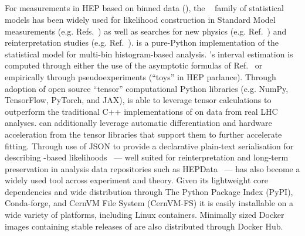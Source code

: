 \subsection{\pyhf{}}\label{subsec:pyhf}

For measurements in HEP based on binned data (), the \HiFa{}~\cite{Cranmer:1456844} family of statistical models has been widely used for likelihood construction in Standard Model measurements (e.g. Refs.~\cite{HIGG-2013-02,Aaij:2015sqa}) as well as searches for new physics (e.g. Ref.~\cite{SUSY-2016-10}) and reinterpretation studies (e.g. Ref.~\cite{Alguero:2020grj}).
\pyhf{} is a pure-Python implementation of the \HiFa{} statistical model for multi-bin histogram-based analysis.
\pyhf{}'s interval estimation is computed through either the use of the asymptotic formulas of Ref.~\cite{Cowan:2010js} or empirically through pseudoexperiments (``toys'' in HEP parlance).
Through adoption of open source ``tensor'' computational Python libraries (e.g. NumPy, TensorFlow, PyTorch, and JAX), \pyhf{} is able to leverage tensor calculations to outperform the traditional C++ implementations of \HiFa{} on data from real LHC analyses.
\pyhf{} can additionally leverage automatic differentiation and hardware acceleration from the tensor libraries that support them to further accelerate fitting.
Through use of JSON to provide a declarative plain-text serialisation for describing \HiFa{}-based likelihoods~\cite{ATL-PHYS-PUB-2019-029} --- well suited for reinterpretation and long-term preservation in analysis data repositories such as HEPData~\cite{Maguire:2017ypu} --- \pyhf{} has also become a widely used tool across experiment and theory.
Given its lightweight core dependencies and wide distribution through The Python Package Index (PyPI), Conda-forge, and CernVM File System (CernVM-FS) it is easily installable on a wide variety of platforms, including Linux containers.
Minimally sized Docker images containing stable releases of \pyhf{} are also distributed through Docker Hub.
